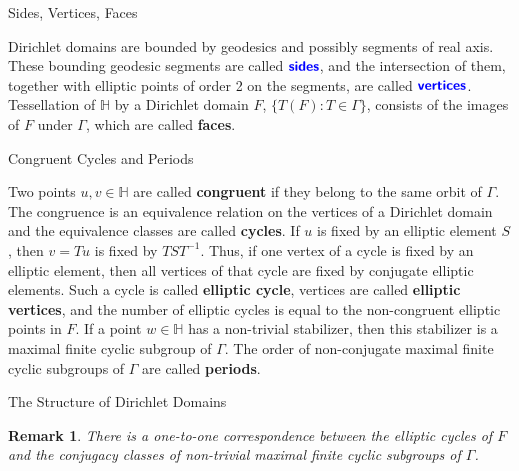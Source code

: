\documentclass[
	american,
	sections numbered,
	usenames,
	xcolor=dvipsnames,
	aspectratio=169,
]{beamer}
\newcommand{\vocab}[1]{\textbf{\color{blue}\sffamily #1}}
\renewcommand{\H}{\mathbb{H}}
\theoremstyle{plain}%
\newtheorem{remark}[theorem]{Remark}
\begin{document}
\begin{frame}{Sides, Vertices, Faces}

	Dirichlet domains are bounded by geodesics and possibly segments of real axis. These bounding geodesic segments are called $\vocab{sides}$, and the intersection of them, together with elliptic points of order 2 on the segments, are called $\vocab{vertices}$. Tessellation of $\mathbb{H}$ by a Dirichlet domain $F$, $\{T(F):T\in\Gamma\}$, consists of the images of $F$ under $\Gamma$, which are called \vocab{faces}.

\end{frame}

\begin{frame}{Congruent Cycles and Periods}

	Two points $u,v\in\mathbb{H}$ are called \vocab{congruent} if they belong to the same orbit of $\Gamma$. The congruence is an equivalence relation on the vertices of a Dirichlet domain and the equivalence classes are called \vocab{cycles}. If $u$ is fixed by an elliptic element $S$, then $v=Tu$ is fixed by $TST^{-1}$. Thus, if one vertex of a cycle is fixed by an elliptic element, then all vertices of that cycle are fixed by conjugate elliptic elements. Such a cycle is called \vocab{elliptic cycle}, vertices are called \vocab{elliptic vertices}, and the number of elliptic cycles is equal to the non-congruent elliptic points in $F$. If a point $w\in\H$ has a non-trivial stabilizer, then this stabilizer is a maximal finite cyclic subgroup of $\Gamma$. The order of non-conjugate maximal finite cyclic subgroups of $\Gamma$ are called \vocab{periods}.

\end{frame}

\begin{frame}{The Structure of Dirichlet Domains}

    \begin{remark}
        There is a one-to-one correspondence between the elliptic cycles of $F$ and the conjugacy classes of non-trivial maximal finite cyclic subgroups of $\Gamma$.
    \end{remark}

\end{frame}
\end{document}
